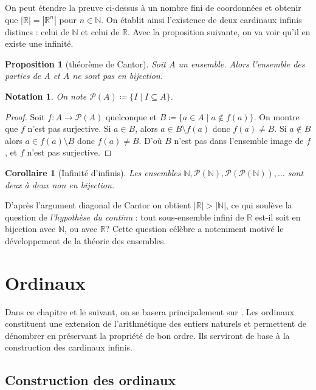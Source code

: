 \documentclass{article}
\theoremstyle{definition}
\theoremstyle{plain}
\newtheorem{proposition}[subsubsection]{Proposition}
\theoremstyle{plain}
\newtheorem{corollary}[subsubsection]{Corollaire}
\theoremstyle{plain}
\theoremstyle{plain}
\theoremstyle{plain}
\newtheorem*{notation}{Notation}
\begin{document}
\par On peut étendre la preuve ci-dessus à un nombre fini de coordonnées et obtenir que \( |\mathbb{R}| = |\mathbb{R}^{n}| \) pour \( n \in \mathbb{N} \). 
On établit ainsi l'existence de deux cardinaux infinis distincs : celui de \( \mathbb{N} \) et celui de \( \mathbb{R} \). Avec la proposition suivante, on va voir qu'il en existe une infinité.
\begin{proposition}[théorème de Cantor]
	Soit \( A \) un ensemble. Alors l'ensemble des parties de A et \( A \) ne sont pas en bijection.
\end{proposition} 
\begin{notation}
	On note \( \mathcal{P}(A) \coloneqq \{ I \mid I \subseteq A \}\).	
\end{notation}
\begin{proof}
	Soit \( f : A \rightarrow \mathcal{P}(A) \) quelconque et \( B \coloneqq \{ a \in A \mid a \not\in f(a)\} \). On montre que \( f \) n'est pas surjective. Si \( a \in B \), alors \( a \in B \setminus f(a) \) donc \( f(a) \neq B \). Si \( a \not\in B\) alors \( a \in f(a) \setminus B \) donc \( f(a) \neq B \). D'où \( B \) n'est pas dans l'ensemble image de \( f \), et \( f \) n'est pas surjective.
\end{proof}
\begin{corollary}[Infinité d'infinis]
	Les ensembles \( \mathbb{N}, \mathcal{P}(\mathbb{N}), \mathcal{P}(\mathcal{P}(\mathbb{N})), \ldots \) sont deux à deux non en bijection.
\end{corollary}

D'après l'argument diagonal de Cantor on obtient \( |\mathbb{R}| > |\mathbb{N}| \), ce qui soulève la question de \textit{l'hypothèse du continu} : tout sous-ensemble infini de \( \mathbb{R} \) est-il soit en bijection avec \( \mathbb{N} \), ou avec \( \mathbb{R} \)? Cette question célèbre a notemment motivé le développement de la théorie des ensembles.

\clearpage
\section{Ordinaux}

Dans ce chapitre et le suivant, on se basera principalement sur \cite{dehornoy2017théorie}. Les ordinaux constituent une extension de l'arithmétique des entiers naturels et permettent de dénombrer en préservant la propriété de bon ordre. Ils serviront de base à la construction des cardinaux infinis. 
\subsection{Construction des ordinaux} 
\end{document}
